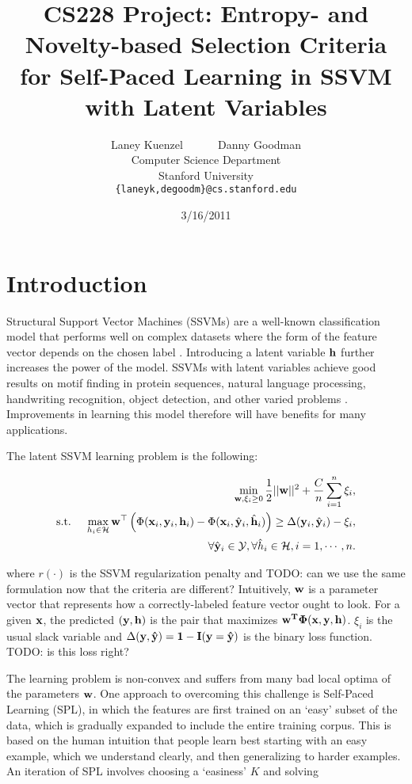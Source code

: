 \documentclass{article}
\title{CS228 Project: Entropy- and Novelty-based Selection Criteria for Self-Paced Learning in SSVM with Latent Variables}
\date{3/16/2011}
\author{
Laney Kuenzel ~~~~~ Danny Goodman\\
Computer Science Department \\
Stanford University \\
\texttt{\{laneyk,degoodm\}@cs.stanford.edu}
}
\newcommand{\mysection}[1]{\vspace{-4mm}\section{#1}\vspace{-4mm}}
\begin{document}
\maketitle
\vspace{-8mm}

\mysection{Introduction}
\label{sec:introduction}
Structural Support Vector Machines (SSVMs) are a well-known classification model that performs well on complex datasets where the form of the feature vector depends on the chosen label \cite{SSVM}.  Introducing a latent variable $\bf h$ further increases the power of the model.  SSVMs with latent variables achieve good results on motif finding in protein sequences, natural language processing, handwriting recognition, object detection, and other varied problems \cite{SPL}.  Improvements in learning this model therefore will have benefits for many applications.

The latent SSVM learning problem is the following\cite{SPL}:

\begin{eqnarray}
&&\min_{{\bf w},\xi_i \geq 0} \frac{1}{2}||{\bf w}||^2 + \frac{C}{n} \sum_{i=1}^n \xi_i, \nonumber \\
\mbox{s.t. } && \max_{h_i \in {\cal H}} {\bf w}^\top \left(\Phi({\bf x}_i,{\bf y}_i,{\bf h}_i) - 
		\Phi({\bf x}_i,\hat{\bf y}_i,\hat{\bf h}_i) \right)
	 \geq \Delta({\bf y}_i,\hat{\bf y}_i) - \xi_i, \nonumber \\
\label{eq:latentSSVM}
&&\forall \hat{\bf y}_i \in {\cal Y}, \forall \hat{h}_i \in {\cal H}, i=1,\cdots,n.
\end{eqnarray}

where $r(\cdot)$ is the SSVM regularization penalty and TODO: can we use the same formulation now that the criteria are different?  Intuitively, $\bf w$ is a parameter vector that represents how a correctly-labeled feature vector ought to look.  For a given $\bf x$, the predicted $(\bf y,\bf h)$ is the pair that maximizes $\bf{{w}} ^T \Phi(\bf x,\bf y,\bf h)$.  $\xi_i$ is the usual slack variable 
and $\Delta(\bf y,\hat{\bf y})=1-I(\bf y=\hat{\bf y})$ is the binary loss function. TODO: is this loss right?

The learning problem is non-convex and suffers from many bad local optima of the parameters $\bf w$.  One approach to overcoming this challenge is Self-Paced Learning (SPL), in which the features are first trained on an `easy' subset of the data, which is gradually expanded to include the entire training corpus\cite{SPL}.  This is based on the human intuition that people learn best starting with an easy example, which we understand clearly, and then generalizing to harder examples.  An iteration of SPL involves choosing a `easiness' $K$ and solving
\end{document}
